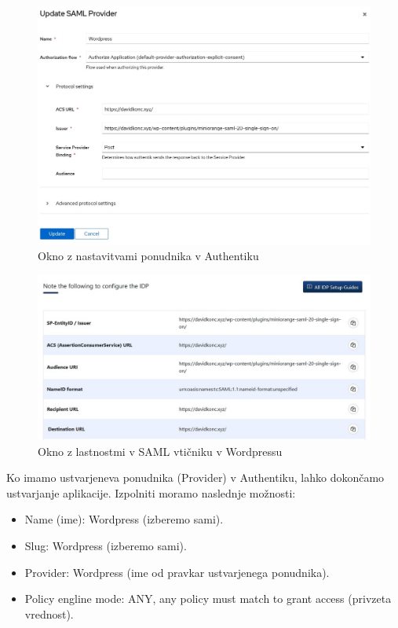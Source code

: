 \documentclass[a4paper,12pt,openright]{book}
\begin{document}
{\begin{figure}[H]
\hspace{-1cm}
\includegraphics[scale=0.6]{diploma-FRI-vzorec_11maj2021/SAMLprovi.jpg}
\caption{Okno z nastavitvami ponudnika v Authentiku}
\label{fig}
\end{figure}

\begin{figure}[H]
\hspace{-4cm}
\includegraphics[scale=0.7]{diploma-FRI-vzorec_11maj2021/WordpressSAML.jpg}
\caption{Okno z lastnostmi v SAML vtičniku v Wordpressu}
\label{fig}
\end{figure}

Ko imamo ustvarjeneva ponudnika (Provider) v Authentiku, lahko dokončamo ustvarjanje aplikacije. Izpolniti moramo naslednje možnosti:
\begin{itemize}
    \item Name (ime): Wordpress (izberemo sami).
    \item Slug: Wordpress (izberemo sami).
    \item Provider: Wordpress (ime od pravkar ustvarjenega ponudnika).
    \item Policy engline mode: ANY, any policy must match to grant access (privzeta vrednost). 
\end{itemize}

}
\end{document}
